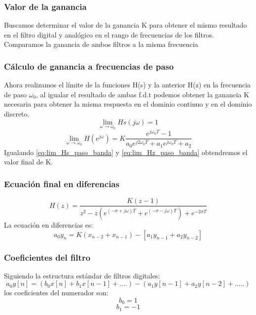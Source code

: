 \documentclass[titlepage]{article}
\begin{document}
\subsubsection{Valor de la ganancia}
Buscamos determinar el valor de la ganancia K para obtener el mismo resultado en el filtro digital y analógico en el rango de frecuencias de los filtros. Comparamos la ganancia de ambos filtros a la misma frecuencia 
\subsubsection{Cálculo de ganancia a frecuencias de paso}
Ahora realizamos el límite de la funciones H(s) y la anterior H(z) en la frecuencia de paso $\omega_0$, al igualar el resultado de ambas f.d.t podemos obtener la ganancia K necesaria para obtener la misma respuesta en el dominio continuo y en el dominio discreto.
\begin{equation}
\label{eq:lim_Hs_paso_banda}\lim_{\omega \to \omega_0}Hs(j\omega)=1
\end{equation}
\begin{equation}
\label{eq:lim_Hz_paso_banda}\lim_{\omega \to \omega_0}H(e^{j\omega})=K\frac{e^{j\omega_0T}-1}{a_0e^{j2\omega_0T}+a_1e^{j\omega_0T}+a_2}
\end{equation}
Igualando \ref{eq:lim_Hs_paso_banda} y \ref{eq:lim_Hz_paso_banda} obtendremos el valor final de K.
\subsubsection{Ecuación final en diferencias}
\begin{equation}
H(z)=\frac{K(z-1)}{z^2-z(e^{(-\sigma+j\omega)T}+e^{(-\sigma-j\omega)T}) + e^{-2{\sigma}T}}
\end{equation}
La ecuación en diferencias es:
\begin{equation}
a_0y_n=K(x_{n-2}+x_{n-1})-[a_1y_{n-1} + a_2y_{n-2}]
\end{equation}

\subsubsection{Coeficientes del filtro}
Siguiendo la estructura estándar de filtros digitales:
\begin{equation}
a_0y[n]=(b_0x[n]+b_1x[n-1]+ ....)-(a_1y[n-1] + a_2y[n-2] + .....)  
\end{equation}
los coeficientes del numerador son:
	\begin{equation}
		b_0=1
	\end{equation}
	\begin{equation}
		b_1=-1
	\end{equation}
	
\end{document}
